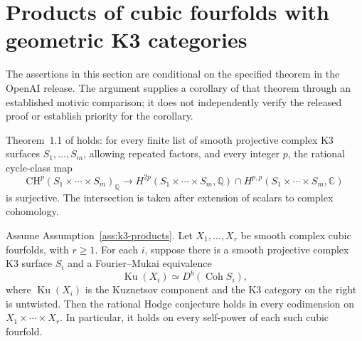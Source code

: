 \section{Products of cubic fourfolds with geometric K3 categories}
\label{sec:cubic-products}

The assertions in this section are conditional on the specified theorem in the
OpenAI release.  The argument supplies a corollary of that theorem through an
established motivic comparison; it does not independently verify the released
proof or establish priority for the corollary.

\begin{assumption}
\label{ass:k3-products}
Theorem~1.1 of \cite{k3} holds: for every finite list of smooth projective
complex K3 surfaces $S_1,\ldots,S_m$, allowing repeated factors, and every
integer $p$, the rational cycle-class map
\[
 \mathrm{CH}^{p}(S_1\times\cdots\times S_m)_{\mathbb Q}
 \longrightarrow
 H^{2p}(S_1\times\cdots\times S_m,\mathbb Q)
       \cap H^{p,p}(S_1\times\cdots\times S_m,\mathbb C)
\]
is surjective.  The intersection is taken after extension of scalars to
complex cohomology.
\end{assumption}

\begin{proposition}
\label{prop:cubic-products}
Assume Assumption~\ref{ass:k3-products}.  Let $X_1,\ldots,X_r$ be smooth
complex cubic fourfolds, with $r\geq 1$.  For each $i$, suppose there is a
smooth projective complex K3 surface $S_i$ and a Fourier--Mukai equivalence
\[
 \operatorname{Ku}(X_i)\simeq D^b(\operatorname{Coh}S_i),
\]
where $\operatorname{Ku}(X_i)$ is the Kuznetsov component and the K3 category
on the right is untwisted.  Then the rational Hodge conjecture holds in every
codimension on $X_1\times\cdots\times X_r$.  In particular, it holds on every
self-power of each such cubic fourfold.
\end{proposition}

